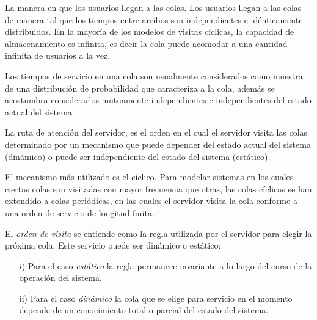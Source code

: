 \documentclass{article}
\begin{document}
La manera en que los usuarios llegan a las colas. Los usuarios llegan a las colas de manera tal que los tiempos entre arribos son independientes e id\'enticamente distribuidos. En la mayor\'ia de los modelos de visitas c\'iclicas, la capacidad de almacenamiento es infinita, es decir la cola puede acomodar a una cantidad infinita de usuarios a la vez.

Los tiempos de servicio en una cola son usualmente considerados como muestra de una distribuci\'on de probabilidad que caracteriza a la cola, adem\'as se acostumbra considerarlos mutuamente independientes e independientes del estado actual del sistema. 


La ruta de atenci\'on del servidor, es el orden en el cual el servidor visita las colas determinado por un mecanismo que puede depender del estado actual del sistema (din\'amico) o puede ser independiente del estado del sistema (est\'atico). 

El mecanismo m\'as utilizado es el c\'iclico. Para modelar sistemas en los cuales ciertas colas son visitadas con mayor frecuencia que otras, las colas c\'iclicas se han extendido a colas peri\'odicas, en las cuales el servidor visita la cola conforme a una orden de servicio de longitud finita. 

El {\em orden de visita} se entiende como la regla utilizada por el servidor para elegir la pr\'oxima cola. Este servicio puede ser din\'amico o est\'atico:

\begin{itemize}
\item[i)] Para el caso {\em est\'atico} la regla permanece invariante a lo largo del curso de la operaci\'on del sistema.

\item[ii)] Para el caso {\em din\'amico} la cola que se elige para servicio en el momento depende de un conocimiento total o parcial del estado del sistema.
\end{itemize}
\end{document}
